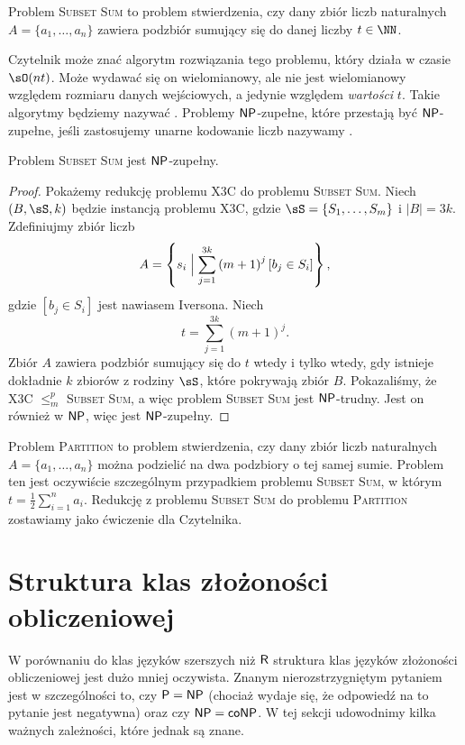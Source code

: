 Problem \textsc{Subset Sum} to problem stwierdzenia, czy dany zbiór liczb naturalnych $A = \{a_1, \ldots, a_n\}$ zawiera podzbiór sumujący się do danej liczby $t \in \NN$.

Czytelnik może znać algorytm rozwiązania tego problemu, który działa w czasie $\sO(nt)$. Może wydawać się on wielomianowy, ale nie jest wielomianowy względem rozmiaru danych wejściowych, a jedynie względem \textit{wartości} $t$. Takie algorytmy będziemy nazywać . Problemy $\textsf{NP}$-zupełne, które przestają być $\textsf{NP}$-zupełne, jeśli zastosujemy unarne kodowanie liczb nazywamy .

\begin{theorem}\label{t:Subset Sum}
    Problem \textsc{Subset Sum} jest $\textsf{NP}$-zupełny.
\end{theorem}
\begin{proof}
    Pokażemy redukcję problemu X3C do problemu \textsc{Subset Sum}. Niech $(B, \sS, k)$ będzie instancją problemu X3C, gdzie $\sS = \{S_1, \ldots, S_m\}$ i $|B| = 3k$. Zdefiniujmy zbiór liczb
    \[ A = \left\{s_i \Bigm| \sum_{j=1}^{3k} \left(m + 1\right)^j \left[b_j \in S_i\right]\right\}, \]
    gdzie $\left[b_j \in S_i\right]$ jest nawiasem Iversona. Niech
    \[ t = \sum_{j=1}^{3k} (m + 1)^j. \]
    Zbiór $A$ zawiera podzbiór sumujący się do $t$ wtedy i tylko wtedy, gdy istnieje dokładnie $k$ zbiorów z rodziny $\sS$, które pokrywają zbiór $B$.
    Pokazaliśmy, że X3C $\leq_m^p$ \textsc{Subset Sum}, a więc problem \textsc{Subset Sum} jest $\textsf{NP}$-trudny. Jest on również w $\textsf{NP}$, więc jest $\textsf{NP}$-zupełny.
\end{proof}

Problem \textsc{Partition} to problem stwierdzenia, czy dany zbiór liczb naturalnych $A = \{a_1, \ldots, a_n\}$ można podzielić na dwa podzbiory o tej samej sumie. Problem ten jest oczywiście szczególnym przypadkiem problemu \textsc{Subset Sum}, w którym $t = \frac{1}{2}\sum_{i=1}^n a_i$. Redukcję z problemu \textsc{Subset Sum} do problemu \textsc{Partition} zostawiamy jako ćwiczenie dla Czytelnika.

\section{Struktura klas złożoności obliczeniowej}

W porównaniu do klas języków szerszych niż $\textsf{R}$ struktura klas języków złożoności obliczeniowej jest dużo mniej oczywista. Znanym nierozstrzygniętym pytaniem jest w szczególności to, czy $\textsf{P} = \textsf{NP}$ (chociaż wydaje się, że odpowiedź na to pytanie jest negatywna) oraz czy $\textsf{NP} = \textsf{coNP}$.
W tej sekcji udowodnimy kilka ważnych zależności, które jednak są znane.

